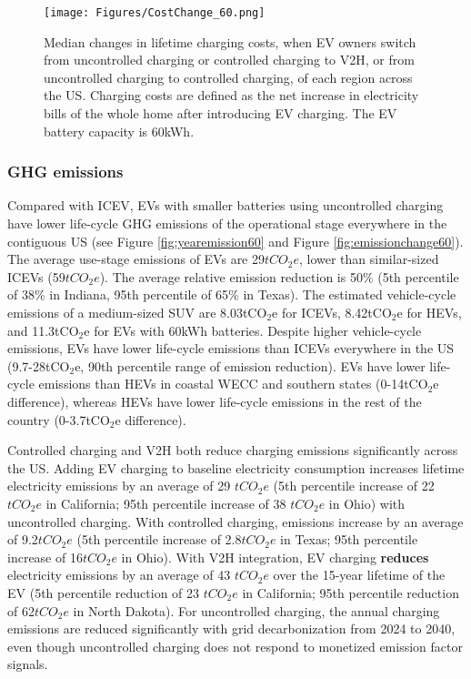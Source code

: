 \documentclass[11pt,preprint]{elsarticle}
\begin{document}
\begin{figure*}
    \centering
    \texttt{[image: Figures/CostChange\_60.png]}
    \caption{Median changes in lifetime charging costs, when EV owners switch from uncontrolled charging or controlled charging to V2H, or from uncontrolled charging to controlled charging, of each region across the US. Charging costs are defined as the net increase in electricity bills of the whole home after introducing EV charging. The EV battery capacity is 60kWh.}
    \label{fig:costchange60}
\end{figure*}

\subsubsection{GHG emissions}

Compared with ICEV, EVs with smaller batteries using uncontrolled charging have lower life-cycle GHG emissions of the operational stage everywhere in the contiguous US (see Figure \ref{fig:yearemission60} and Figure \ref{fig:emissionchange60}). The average use-stage emissions of EVs are 29$tCO_2e$, lower than similar-sized ICEVs (59$tCO_2e$). The average relative emission reduction is 50\% (5th percentile of 38\% in Indiana, 95th percentile of 65\% in Texas). The estimated vehicle-cycle emissions of a medium-sized SUV are 8.03tCO$_2$e for ICEVs, 8.42tCO$_2$e for HEVs, and 11.3tCO$_2$e for EVs with 60kWh batteries. Despite higher vehicle-cycle emissions, EVs have lower life-cycle emissions than ICEVs everywhere in the US (9.7-28tCO$_2$e, 90th percentile range of emission reduction). EVs have lower life-cycle emissions than HEVs in coastal WECC and southern states (0-14tCO$_2$e difference), whereas HEVs have lower life-cycle emissions in the rest of the country (0-3.7tCO$_2$e difference).

Controlled charging and V2H both reduce charging emissions significantly across the US. Adding EV charging to baseline electricity consumption increases lifetime electricity emissions by an average of 29 $tCO_2e$ (5th percentile increase of 22 $tCO_2e$ in California; 95th percentile increase of 38 $tCO_2e$ in Ohio) with uncontrolled charging. With controlled charging, emissions increase by an average of 9.2$tCO_2e$ (5th percentile increase of 2.8$tCO_2e$ in Texas; 95th percentile increase of 16$tCO_2e$ in Ohio). With V2H integration, EV charging \textbf{reduces} electricity emissions by an average of 43 $tCO_2e$ over the 15-year lifetime of the EV (5th percentile reduction of 23 $tCO_2e$ in California; 95th percentile reduction of 62$tCO_2e$ in North Dakota). For uncontrolled charging, the annual charging emissions are reduced significantly with grid decarbonization from 2024 to 2040, even though uncontrolled charging does not respond to monetized emission factor signals. 
\end{document}

